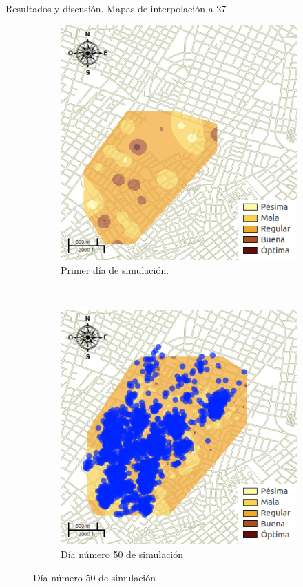 \begin{frame}[t]{Resultados y discusión. Mapas de interpolación a 27 \textcelsius}
    \begin{figure}
    \begin{subfigure}[b]{0.45\textwidth}
        \includegraphics[width=\textwidth]{./graphics/temp-27-0.png}
        \caption{ Primer día de simulación.}
    \end{subfigure}
    ~~~~
    \begin{subfigure}[b]{0.45\textwidth}
        \includegraphics[width=\textwidth]{./graphics/temp-27-final.png}
        \caption{Día número 50 de simulación}
    \end{subfigure}
    \end{figure}
\end{frame}

